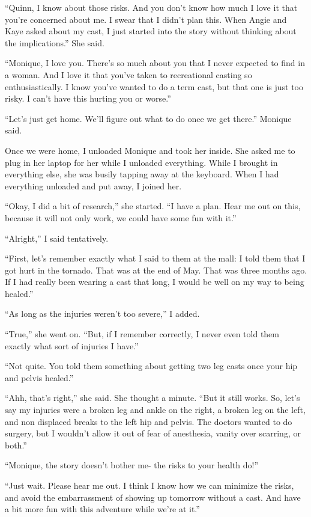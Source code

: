 ``Quinn, I know about those risks. And you don't know how much I love it that you're
concerned about me. I swear that I didn't plan this. When Angie and Kaye asked about my cast, I
just started into the story without thinking about the implications.'' She said.

``Monique, I love you. There's so much about you that I never expected to find in a woman.
And I love it that you've taken to recreational casting so enthusiastically. I know you've
wanted to do a term cast, but that one is just too risky. I can't have this hurting you or
worse.''

``Let's just get home. We'll figure out what to do once we get there.'' Monique said.

Once we were home, I unloaded Monique and took her inside. She asked me to plug in her
laptop for her while I unloaded everything. While I brought in everything else, she was busily
tapping away at the keyboard. When I had everything unloaded and put away, I joined her.

``Okay, I did a bit of research,'' she started. ``I have a plan. Hear me out on this, because
it will not only work, we could have some fun with it.''

``Alright,'' I said tentatively.

``First, let's remember exactly what I said to them at the mall: I told them that I got hurt
in the tornado. That was at the end of May. That was three months ago. If I had really been
wearing a cast that long, I would be well on my way to being healed.''

``As long as the injuries weren't too severe,'' I added.

``True,'' she went on. ``But, if I remember correctly, I never even told them exactly what
sort of injuries I have.''

``Not quite. You told them something about getting two leg casts once your hip and pelvis
healed.''

``Ahh, that's right,'' she said. She thought a minute. ``But it still works. So, let's say my
injuries were a broken leg and ankle on the right, a broken leg on the left, and non displaced
breaks to the left hip and pelvis. The doctors wanted to do surgery, but I wouldn't allow it out
of fear of anesthesia, vanity over scarring, or both.''

``Monique, the story doesn't bother me- the risks to your health do!''

``Just wait. Please hear me out. I think I know how we can minimize the risks, and avoid the
embarrassment of showing up tomorrow without a cast. And have a bit more fun with this adventure
while we're at it.''

